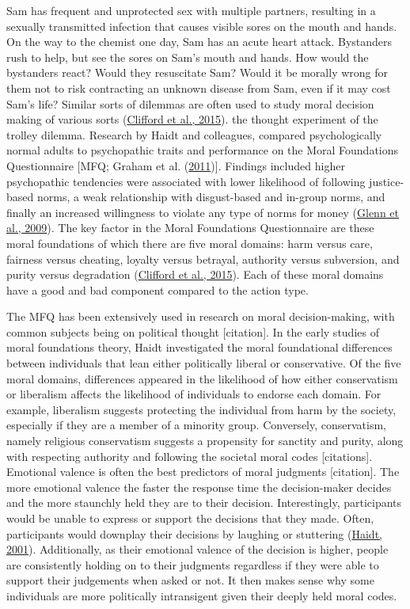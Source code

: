 \documentclass[
  donotrepeattitle,doc, 12pt, a4paper,floatsintext]{apa7}
\begin{document}
Sam has frequent and unprotected sex with multiple partners, resulting in a sexually transmitted infection that causes visible sores on the mouth and hands. On the way to the chemist one day, Sam has an acute heart attack. Bystanders rush to help, but see the sores on Sam's mouth and hands. How would the bystanders react? Would they resuscitate Sam? Would it be morally wrong for them not to risk contracting an unknown disease from Sam, even if it may cost Sam's life? Similar sorts of dilemmas are often used to study moral decision making of various sorts (\protect\hyperlink{ref-clifford2015}{Clifford et al., 2015}). the thought experiment of the trolley dilemma. Research by Haidt and colleagues, compared psychologically normal adults to psychopathic traits and performance on the Moral Foundations Questionnaire {[}MFQ; Graham et al. (\protect\hyperlink{ref-graham2011}{2011}){]}. Findings included higher psychopathic tendencies were associated with lower likelihood of following justice-based norms, a weak relationship with disgust-based and in-group norms, and finally an increased willingness to violate any type of norms for money (\protect\hyperlink{ref-glenn2009}{Glenn et al., 2009}). The key factor in the Moral Foundations Questionnaire are these moral foundations of which there are five moral domains: harm versus care, fairness versus cheating, loyalty versus betrayal, authority versus subversion, and purity versus degradation (\protect\hyperlink{ref-clifford2015}{Clifford et al., 2015}). Each of these moral domains have a good and bad component compared to the action type.

The MFQ has been extensively used in research on moral decision-making, with common subjects being on political thought {[}citation{]}. In the early studies of moral foundations theory, Haidt investigated the moral foundational differences between individuals that lean either politically liberal or conservative. Of the five moral domains, differences appeared in the likelihood of how either conservatism or liberalism affects the likelihood of individuals to endorse each domain. For example, liberalism suggests protecting the individual from harm by the society, especially if they are a member of a minority group. Conversely, conservatism, namely religious conservatism suggests a propensity for sanctity and purity, along with respecting authority and following the societal moral codes {[}citations{]}. Emotional valence is often the best predictors of moral judgments {[}citation{]}. The more emotional valence the faster the response time the decision-maker decides and the more staunchly held they are to their decision. Interestingly, participants would be unable to express or support the decisions that they made. Often, participants would downplay their decisions by laughing or stuttering (\protect\hyperlink{ref-haidt2001}{Haidt, 2001}). Additionally, as their emotional valence of the decision is higher, people are consistently holding on to their judgments regardless if they were able to support their judgements when asked or not. It then makes sense why some individuals are more politically intransigent given their deeply held moral codes.
\end{document}
